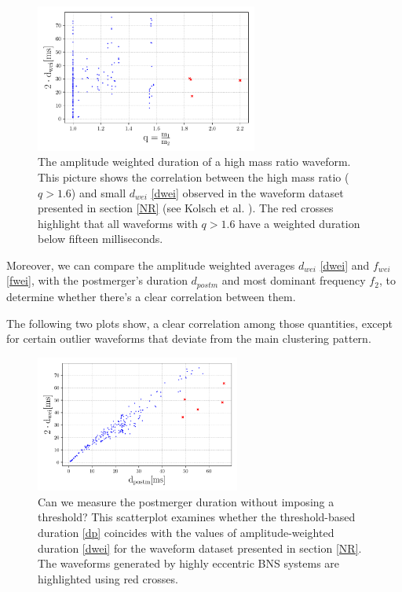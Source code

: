 \begin{figure}[hbt!]
\begin{center}
\includegraphics[width=0.65\textwidth, angle=0]{images/Data_analysis/results/Mr.pdf}
\captionsetup{width=0.8\textwidth}
\caption[The amplitude weighted duration of a high mass ratio waveform]{The amplitude weighted duration of a high mass ratio waveform. This picture shows the correlation between the high mass ratio ($q>1.6$) and small $d_{wei}$ \ref{dwei} observed in the waveform dataset presented in section \ref{NR} (see Kolsch et al. \cite{Kolsch:2021lub}). The red crosses highlight that all waveforms with $q>1.6$ have a weighted duration below fifteen milliseconds.}
\label{High mass ratio}
\end{center}
\end{figure}
\FloatBarrier


Moreover, we can compare the amplitude weighted averages $d_{wei}$ \ref{dwei} and $f_{wei}$ \ref{fwei}, with the postmerger's duration $d_{postm}$ and most dominant frequency $f_2$, to determine whether there's a clear correlation between them.

The following two plots show, a clear correlation among those quantities, except for certain outlier waveforms that deviate from the main clustering pattern. 

\begin{figure}[hbt!]
\begin{center}
\includegraphics[width=0.6\textwidth, angle=0]{images/Data_analysis/results/res1.pdf}
\captionsetup{width=0.8\textwidth}
\caption[Can we measure the postmerger duration without imposing a threshold?]{Can we measure the postmerger duration without imposing a threshold? This scatterplot examines whether the threshold-based duration \ref{dp} coincides with the values of amplitude-weighted duration \ref{dwei} for the waveform dataset presented in section \ref{NR}. The waveforms generated by highly eccentric BNS systems are highlighted using red crosses.}
\label{duration measure}
\end{center}
\end{figure}

